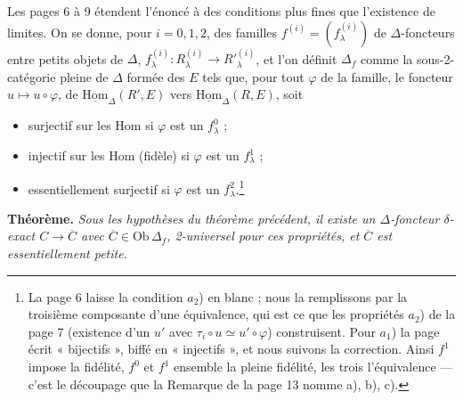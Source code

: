\documentclass[11pt,a4paper]{article}
\begin{document}
Les pages 6 à 9 étendent l'énoncé à des conditions plus fines que
l'existence de limites. On se donne, pour $i = 0, 1, 2$, des familles
$f^{(i)} = (f^{(i)}_{\lambda})$ de $\Delta$-foncteurs entre petits objets de
$\Delta$, $f^{(i)}_{\lambda} : R^{(i)}_{\lambda} \to R'^{(i)}_{\lambda}$, et
l'on définit $\Delta_{f}$ comme la sous-2-catégorie pleine de $\Delta$
formée des $E$ tels que, pour tout $\varphi$ de la famille, le foncteur
$u \mapsto u \circ \varphi$, de $\underline{\mathrm{Hom}}_{\Delta}(R', E)$
vers $\underline{\mathrm{Hom}}_{\Delta}(R, E)$, soit
\begin{itemize}
\item[$a_{0}$)] surjectif sur les Hom si $\varphi$ est un $f^{0}_{\lambda}$ ;
\item[$a_{1}$)] injectif sur les Hom (fidèle) si $\varphi$ est un
$f^{1}_{\lambda}$ ;
\item[$a_{2}$)] essentiellement surjectif si $\varphi$ est un
$f^{2}_{\lambda}$.\footnote{La page 6 laisse la condition $a_{2}$) en
blanc ; nous la remplissons par la troisième composante d'une équivalence,
qui est ce que les propriétés $a_{2}$) de la page 7 (existence d'un $u'$
avec $\tau_{i} \circ u \simeq u' \circ \varphi$) construisent. Pour
$a_{1}$) la page écrit « bijectifs », biffé en « injectifs », et nous
suivons la correction. Ainsi $f^{1}$ impose la fidélité, $f^{0}$ et $f^{1}$
ensemble la pleine fidélité, les trois l'équivalence — c'est le
découpage que la Remarque de la page 13 nomme a), b), c).}
\end{itemize}

\textbf{Théorème.} \emph{Sous les hypothèses du théorème précédent, il
existe un $\Delta$-foncteur $\delta$-exact $C \to \overline{C}$ avec
$\overline{C} \in \mathrm{Ob}\,\Delta_{f}$, 2-universel pour ces
propriétés, et $\overline{C}$ est essentiellement petite.}
\end{document}
